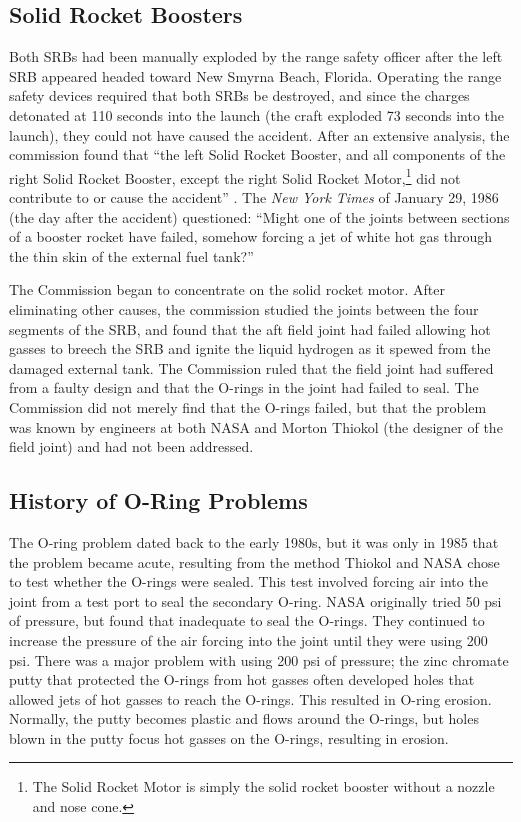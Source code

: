 \subsection{Solid Rocket Boosters}

Both SRBs had been manually exploded by the range safety officer
after the left SRB appeared headed toward New Smyrna Beach,
Florida.
Operating the range safety devices required that both SRBs
be destroyed, and since the charges detonated at 110 seconds
into the launch (the craft exploded 73 seconds into the
launch), they could not have caused the accident.
After an extensive analysis, the commission found that ``the
left Solid Rocket Booster, and all components of the right
Solid Rocket Booster, except the right Solid Rocket
Motor,\footnote{The Solid Rocket Motor is simply the solid
rocket booster without a nozzle and nose cone.}
did not contribute to or cause the accident''
\cite[vol 1, p. 53]{rogers}.  The {\em New York Times} of
January 29, 1986 (the day after the accident) questioned:
``Might one of the joints between sections of a booster rocket have failed,
somehow forcing a jet of white hot gas through the thin skin
of the external fuel tank?'' \cite{nytexternal}

The Commission began to concentrate on the solid rocket
motor.
After eliminating other causes, the commission studied the
joints between the four segments of the SRB, and found that
the aft field joint had failed allowing hot gasses to breech
the SRB and ignite the liquid hydrogen as it spewed from the
damaged external tank.
The Commission ruled that the field joint had suffered from
a faulty design and that the O-rings in the joint had failed
to seal.
The Commission did not merely find that the O-rings failed,
but that the problem was known by engineers at both NASA and
Morton Thiokol (the designer of the field joint) and had not
been addressed.

\subsection{History of O-Ring Problems}

The O-ring problem dated back to the early 1980s, but it was
only in 1985 that the problem became acute, resulting from
the method Thiokol and NASA chose to test whether the
O-rings were sealed.
This test involved forcing air into the joint from a test
port to seal the secondary O-ring.
NASA originally tried 50 psi of pressure, but found that
inadequate to seal the O-rings.
They continued to increase the pressure of the air forcing
into the joint until they were using 200 psi.
There was a major problem with using 200 psi of pressure;
the zinc chromate putty that protected the O-rings from hot
gasses often developed holes that allowed jets of hot gasses to
reach the O-rings.
This resulted in O-ring erosion.  Normally, the putty
becomes plastic and flows around the O-rings, but holes
blown in the putty focus hot gasses on
the O-rings, resulting in erosion.

